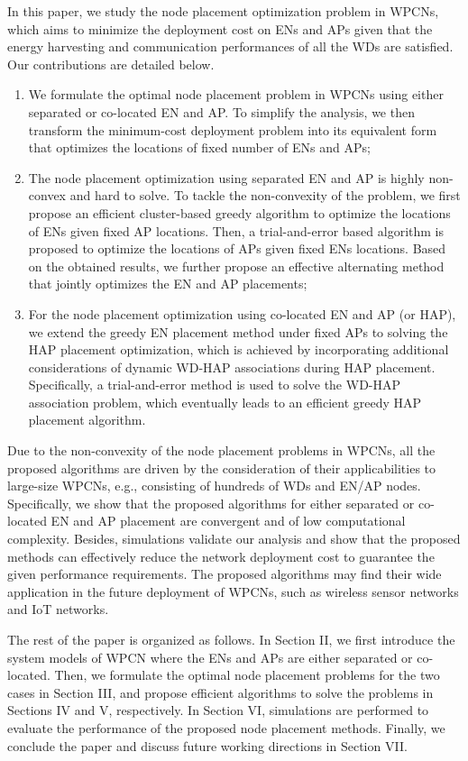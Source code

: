 \documentclass[journal, draftcls, one column, 12pt]{IEEEtran}
\begin{document}
In this paper, we study the node placement optimization problem in WPCNs, which aims to minimize the deployment cost on ENs and APs given that the energy harvesting and communication performances of all the WDs are satisfied. Our contributions are detailed below.
\begin{enumerate}
  \item We formulate the optimal node placement problem in WPCNs using either separated or co-located EN and AP. To simplify the analysis, we then transform the minimum-cost deployment problem into its equivalent form that optimizes the locations of fixed number of ENs and APs;
  \item The node placement optimization using separated EN and AP is highly non-convex and hard to solve. To tackle the non-convexity of the problem, we first propose an efficient cluster-based greedy algorithm to optimize the locations of ENs given fixed AP locations. Then, a trial-and-error based algorithm is proposed to optimize the locations of APs given fixed ENs locations. Based on the obtained results, we further propose an effective alternating method that jointly optimizes the EN and AP placements;
  \item For the node placement optimization using co-located EN and AP (or HAP), we extend the greedy EN placement method under fixed APs to solving the HAP placement optimization, which is achieved by incorporating additional considerations of dynamic WD-HAP associations during HAP placement. Specifically, a trial-and-error method is used to solve the WD-HAP association problem, which eventually leads to an efficient greedy HAP placement algorithm.
\end{enumerate}
Due to the non-convexity of the node placement problems in WPCNs, all the proposed algorithms are driven by the consideration of their applicabilities to large-size WPCNs, e.g., consisting of hundreds of WDs and EN/AP nodes. Specifically, we show that the proposed algorithms for either separated or co-located EN and AP placement are convergent and of low computational complexity. Besides, simulations validate our analysis and show that the proposed methods can effectively reduce the network deployment cost to guarantee the given performance requirements. The proposed algorithms may find their wide application in the future deployment of WPCNs, such as wireless sensor networks and IoT networks.

The rest of the paper is organized as follows. In Section II, we first introduce the system models of WPCN where the ENs and APs are either separated or co-located. Then, we formulate the optimal node placement problems for the two cases in Section III, and propose efficient algorithms to solve the problems in Sections IV and V, respectively. In Section VI, simulations are performed to evaluate the performance of the proposed node placement methods. Finally, we conclude the paper and discuss future working directions in Section VII.
\end{document}

